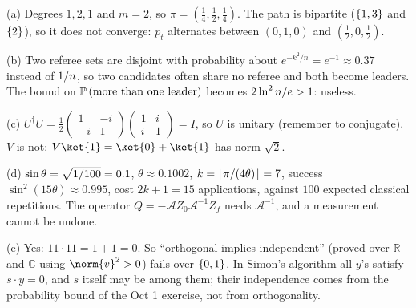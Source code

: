 \begin{msolution}
    (a) Degrees $1, 2, 1$ and $m = 2$, so $\pi = \left(\frac{1}{4}, \frac{1}{2}, \frac{1}{4}\right)$.
    The path is bipartite ($\left\lbrace1,3\right\rbrace$ and $\left\lbrace2\right\rbrace$), so it does not converge: $p_t$ alternates
    between $(0, 1, 0)$ and $\left(\frac{1}{2}, 0, \frac{1}{2}\right)$.

    (b) Two referee sets are disjoint with probability about $e^{-k^2/n} = e^{-1} \approx 0.37$
    instead of $1/n$, so two candidates often share no referee and both become leaders.
    The bound on $\operatorname{\mathbb{P}}\left(\text{more than one leader}\right)$ becomes $2\ln^2 n/e > 1$: useless.

    (c) $U^\dagger U = \frac{1}{2}\begin{pmatrix} 1 & -i \\ -i & 1 \end{pmatrix}\begin{pmatrix} 1 & i \\ i & 1 \end{pmatrix} = I$,
    so $U$ is unitary (remember to conjugate). $V$ is not: $V\ket{1} = \ket{0} + \ket{1}$ has norm
    $\sqrt{2}$.

    (d) $\sin\theta = \sqrt{1/100} = 0.1$, $\theta \approx 0.1002$,
    $k = \floor{\sfrac{\pi}{(4\theta)}} = 7$, success $\sin^2(15\theta) \approx 0.995$, cost
    $2k + 1 = 15$ applications, against $100$ expected classical repetitions. The operator
    $Q = -\mathcal{A}Z_0\mathcal{A}^{-1}Z_f$ needs $\mathcal{A}^{-1}$, and a measurement cannot be
    undone.

    (e) Yes: $11 \cdot 11 = 1 + 1 = 0$. So ``orthogonal implies independent'' (proved over
    $\mathbb{R}$ and $\mathbb{C}$ using $\norm{v}^2 > 0$) fails over $\left\lbrace0,1\right\rbrace$. In Simon's
    algorithm all $y$'s satisfy $s \cdot y = 0$, and $s$ itself may be among them; their
    independence comes from the probability bound of the Oct 1 exercise, not from orthogonality.
\end{msolution}


